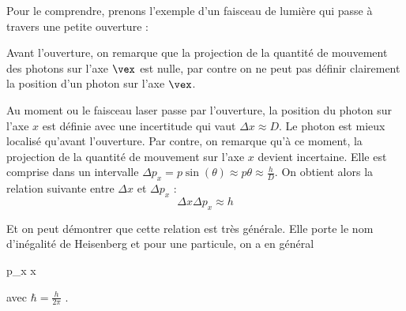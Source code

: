 \documentclass[MPSI]{cours}
\begin{document}
Pour le comprendre, prenons l'exemple d'un faisceau de lumière qui passe à travers une petite ouverture :
\begin{center}
\end{center}

Avant l'ouverture, on remarque que la projection de la quantité de mouvement des photons sur l'axe $\vex$ est nulle, par contre on ne peut pas définir clairement la position d'un photon sur l'axe $\vex$. 

Au moment ou le faisceau laser passe par l'ouverture, la position du photon sur l'axe $x$ est définie avec une incertitude qui vaut $\Delta x\approx D$. Le photon est mieux localisé qu'avant l'ouverture. Par contre, on remarque qu'à ce moment, la projection de la quantité de mouvement sur l'axe $x$ devient incertaine. Elle est comprise dans un intervalle $\Delta p_x = p\sin(\theta) \approx p\theta \approx \frac{h}{D}$.
On obtient alors la relation suivante entre $\Delta x$ et $\Delta p_x$ :
\begin{equation}
  \Delta x \Delta p_x \approx h
\end{equation}

Et on peut démontrer que cette relation est très générale. Elle porte le nom d'inégalité de Heisenberg et pour une particule, on a en général

\begin{eqencadre}
  \Delta p_x \Delta x \geq \hbar
\end{eqencadre}

avec $\hbar = \frac{h}{2\pi}$ .

\end{document}
